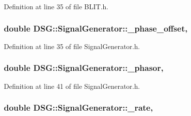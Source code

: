 Definition at line 35 of file B\-L\-I\-T.\-h.

\hypertarget{classDSG_1_1SignalGenerator_a9abf9d00c798e0fdca6314f17547758a}{
\subsubsection[{\-\_\-phase\-\_\-offset}]{\setlength{\rightskip}{0pt plus 5cm}double D\-S\-G\-::\-Signal\-Generator\-::\-\_\-phase\-\_\-offset\hspace{0.3cm}{\ttfamily [protected]}, {\ttfamily [inherited]}}}\label{classDSG_1_1SignalGenerator_a9abf9d00c798e0fdca6314f17547758a}


Definition at line 35 of file Signal\-Generator.\-h.

\hypertarget{classDSG_1_1SignalGenerator_ac2271b582bf699275f077ecb642a8cd9}{
\subsubsection[{\-\_\-phasor}]{\setlength{\rightskip}{0pt plus 5cm}double D\-S\-G\-::\-Signal\-Generator\-::\-\_\-phasor\hspace{0.3cm}{\ttfamily [protected]}, {\ttfamily [inherited]}}}\label{classDSG_1_1SignalGenerator_ac2271b582bf699275f077ecb642a8cd9}


Definition at line 41 of file Signal\-Generator.\-h.

\hypertarget{classDSG_1_1SignalGenerator_aa10f6c85d9adee901139ea7fb346f39d}{
\subsubsection[{\-\_\-rate}]{\setlength{\rightskip}{0pt plus 5cm}double D\-S\-G\-::\-Signal\-Generator\-::\-\_\-rate\hspace{0.3cm}{\ttfamily [protected]}, {\ttfamily [inherited]}}}\label{classDSG_1_1SignalGenerator_aa10f6c85d9adee901139ea7fb346f39d}


